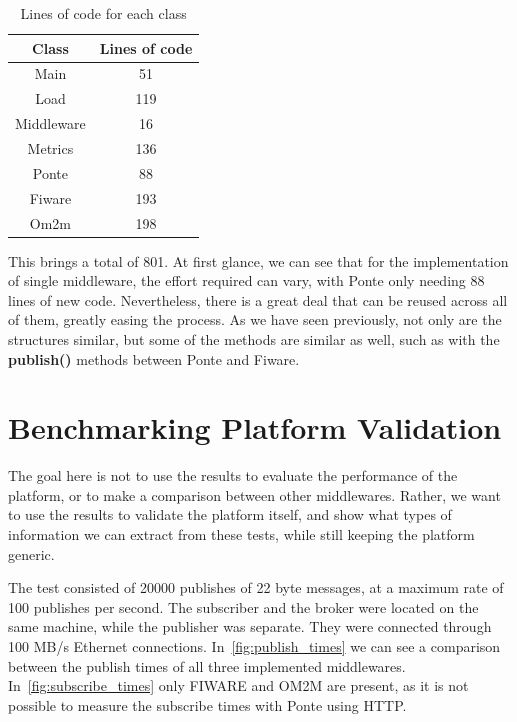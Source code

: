 \documentclass[conference]{IEEEtran}
\begin{document}
\begin{table}[htbp!]
  \centering
  \begin{tabular}{|c|c|}
    \hline 
    \textbf{Class} & \textbf{Lines of code} \\
    \hline 
    Main & 51 \\ 
    \hline
    Load & 119 \\
    \hline
    Middleware & 16 \\
    \hline
    Metrics & 136 \\
    \hline
    Ponte & 88 \\
    \hline
    Fiware & 193 \\
    \hline
    Om2m & 198 \\
    \hline
  \end{tabular}
  \vspace{1mm}
  \caption{Lines of code for each class}
  \label{tab:lines_code}
\end{table}


This brings a total of 801. At first glance, we can see that for the implementation of single middleware, the effort required can vary, with Ponte only needing 88 lines of new code. Nevertheless, there is a great deal that can be reused across all of them, greatly easing the process. As we have seen previously, not only are the structures similar, but some of the methods are similar as well, such as with the \textbf{publish()} methods between Ponte and Fiware.

\section{Benchmarking Platform Validation}

The goal here is not to use the results to evaluate the performance of the platform, or to make a comparison between other middlewares. Rather, we want to use the results to validate the platform itself, and show what types of information we can extract from these tests, while still keeping the platform generic.

The test consisted of 20000 publishes of 22 byte messages, at a maximum rate of 100 publishes per second. The subscriber and the broker were located on the same machine, while the publisher was separate. They were connected through 100 MB/s Ethernet connections. In~\ref{fig:publish_times} we can see a comparison between the publish times of all three implemented middlewares. In~\ref{fig:subscribe_times} only FIWARE and OM2M are present, as it is not possible to measure the subscribe times with Ponte using HTTP. 
\end{document}

